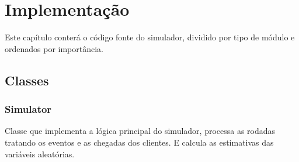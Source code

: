 \lstset{
  language=Python,
  breaklines=true,
  numbers=left,
  numberstyle=\footnotesize,
  stepnumber=1,
  numbersep=5pt
}

\chapter{Implementação}

Este capítulo conterá o código fonte do simulador, dividido por tipo de módulo e ordenados por importância.\\

\section{Classes}

\subsection{Simulator}
Classe que implementa a lógica principal do simulador, processa as rodadas tratando os eventos e as chegadas dos clientes. E calcula as estimativas das variáveis aleatórias.\\

